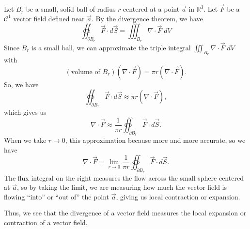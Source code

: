 \documentclass{ximera}
\begin{document}
Let $B_r$ be a small, solid ball of radius $r$ centered at a point $\vec{a}$ in $\mathbb{R}^3$. Let $\vec{F}$ be a $\mathcal{C}^1$ vector field defined near $\vec{a}$. By the divergence theorem, we have
\[
\oiint_{\partial B_r} \vec{F}\cdot d\vec{S} = \iiint_{B_r} \nabla\cdot \vec{F}\;dV
\]
Since $B_r$ is a small ball, we can approximate the triple integral $\iiint_{B_r} \nabla\cdot \vec{F}\;dV$ with
\[
(\text{volume of }B_r)\left(\nabla\cdot \vec{F}\right) = \pi r \left(\nabla\cdot \vec{F}\right) .
\]
So, we have
\[
\oiint_{\partial B_r} \vec{F}\cdot d\vec{S} \approx \pi r \left(\nabla\cdot \vec{F}\right),
\]
which gives us 
\[
\nabla\cdot \vec{F} \approx \frac{1}{\pi r}\oiint_{\partial B_r} \vec{F}\cdot d\vec{S}.
\]
When we take $r\rightarrow 0$, this approximation because more and more accurate, so we have
\[
\nabla\cdot \vec{F} = \lim_{r\rightarrow 0} \frac{1}{\pi r}\oiint_{\partial B_r} \vec{F}\cdot d\vec{S}.
\]
The flux integral on the right measures the flow across the small sphere centered at $\vec{a}$, so by taking the limit, we are measuring how much the vector field is flowing ``into'' or ``out of'' the point $\vec{a}$, giving us local contraction or expansion.

Thus, we see that the divergence of a vector field measures the local expansion or contraction of a vector field.
\end{document}
